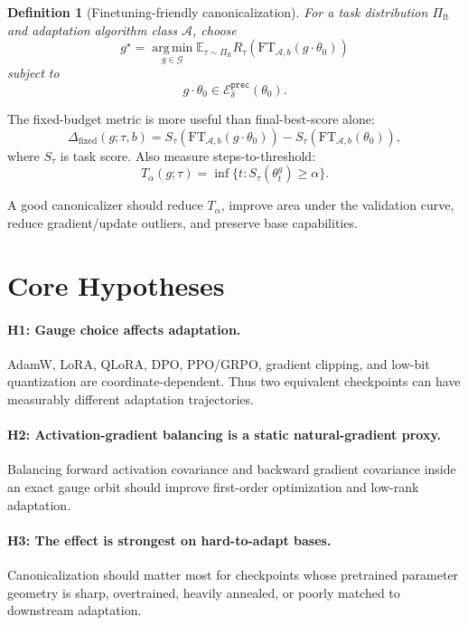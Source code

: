 \documentclass[11pt]{article}
\newcommand{\E}{\mathbb{E}}
\newcommand{\argmin}{\operatorname*{arg\,min}}
\newcommand{\calA}{\mathcal{A}}
\newcommand{\calE}{\mathcal{E}}
\newcommand{\calG}{\mathcal{G}}
\newcommand{\thetazero}{\theta_0}
\newtheorem{definition}{Definition}
\begin{document}
\begin{definition}[Finetuning-friendly canonicalization]
For a task distribution $\Pi_{\mathrm{ft}}$ and adaptation algorithm class $\calA$, choose
\[
    g^\star
    =
    \argmin_{g\in\calG}
    \E_{\tau\sim\Pi_{\mathrm{ft}}}
    R_\tau\left(
    \mathrm{FT}_{\calA,b}(g\cdot\thetazero)
    \right)
\]
subject to
\[
    g\cdot\thetazero\in \calE_{\delta}^{\texttt{prec}}(\thetazero).
\]
\end{definition}

The fixed-budget metric is more useful than final-best-score alone:
\[
    \Delta_{\mathrm{fixed}}(g;\tau,b)
    =
    S_{\tau}\left(\mathrm{FT}_{\calA,b}(g\cdot\thetazero)\right)
    -
    S_{\tau}\left(\mathrm{FT}_{\calA,b}(\thetazero)\right),
\]
where $S_\tau$ is task score. Also measure steps-to-threshold:
\[
    T_{\alpha}(g;\tau)
    =
    \inf\{t: S_\tau(\theta_t^g)\ge \alpha\}.
\]

A good canonicalizer should reduce $T_\alpha$, improve area under the validation curve, reduce gradient/update outliers, and preserve base capabilities.

\section{Core Hypotheses}

\paragraph{H1: Gauge choice affects adaptation.}
AdamW, LoRA, QLoRA, DPO, PPO/GRPO, gradient clipping, and low-bit quantization are coordinate-dependent. Thus two equivalent checkpoints can have measurably different adaptation trajectories.

\paragraph{H2: Activation-gradient balancing is a static natural-gradient proxy.}
Balancing forward activation covariance and backward gradient covariance inside an exact gauge orbit should improve first-order optimization and low-rank adaptation.

\paragraph{H3: The effect is strongest on hard-to-adapt bases.}
Canonicalization should matter most for checkpoints whose pretrained parameter geometry is sharp, overtrained, heavily annealed, or poorly matched to downstream adaptation.
\end{document}
